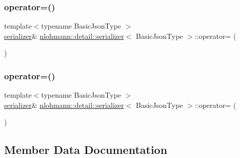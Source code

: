 \subsubsection{\texorpdfstring{operator=()}{operator=()}\hspace{0.1cm}{\footnotesize\ttfamily [1/2]}}
{\footnotesize\ttfamily template$<$typename Basic\+Json\+Type $>$ \\
\hyperlink{classnlohmann_1_1detail_1_1serializer}{serializer}\& \hyperlink{classnlohmann_1_1detail_1_1serializer}{nlohmann\+::detail\+::serializer}$<$ Basic\+Json\+Type $>$\+::operator= (\begin{DoxyParamCaption}\item[{const \hyperlink{classnlohmann_1_1detail_1_1serializer}{serializer}$<$ Basic\+Json\+Type $>$ \&}]{ }\end{DoxyParamCaption})\hspace{0.3cm}{\ttfamily [delete]}}

\mbox{\label{classnlohmann_1_1detail_1_1serializer_acaafe3436ee5fb74777eb4132a88c513}} 
\subsubsection{\texorpdfstring{operator=()}{operator=()}\hspace{0.1cm}{\footnotesize\ttfamily [2/2]}}
{\footnotesize\ttfamily template$<$typename Basic\+Json\+Type $>$ \\
\hyperlink{classnlohmann_1_1detail_1_1serializer}{serializer}\& \hyperlink{classnlohmann_1_1detail_1_1serializer}{nlohmann\+::detail\+::serializer}$<$ Basic\+Json\+Type $>$\+::operator= (\begin{DoxyParamCaption}\item[{\hyperlink{classnlohmann_1_1detail_1_1serializer}{serializer}$<$ Basic\+Json\+Type $>$ \&\&}]{ }\end{DoxyParamCaption})\hspace{0.3cm}{\ttfamily [delete]}}



\subsection{Member Data Documentation}
\mbox{\label{classnlohmann_1_1detail_1_1serializer_a311e5d6f4b31d5be0eb3c0cb20b6965a}} 
